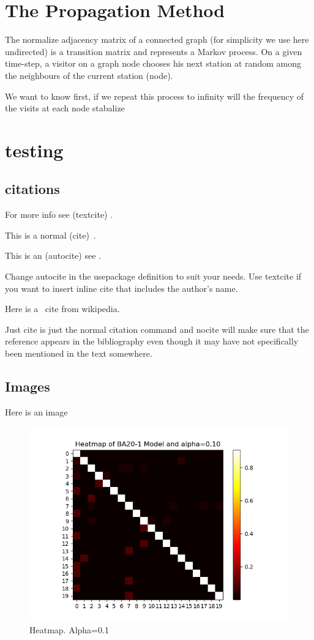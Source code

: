 \documentclass[a4paper,10pt]{article}
\theoremstyle{definition}
\theoremstyle{remark}
\theoremstyle{plain}
\begin{document}
\section{The Propagation Method}
The normalize adjacency matrix of 
a connected graph (for simplicity we use here undirected) is a transition matrix
and represents a
Markov process. On a given time-step, a visitor on a graph node chooses
his next station at random among the neighbours of the current station (node).

We want to know first, if we repeat this process to infinity will the frequency
of the visits at each node stabalize 

\section{testing}

\subsection{citations}

For more info see (textcite) \textcite[631]{meyer2000matrix}.

This is a normal (cite)~\cite[p.~115]{big}.

This is an (autocite) see \autocite[231]{lion2010}.

Change autocite in the usepackage definition to suit your needs. Use textcite if
you want to insert inline cite that includes the author's name.

Here is a~\cite{WikipediaPerronFrobenius} cite from wikipedia.

Just cite is just the normal citation command and nocite will make sure that the
reference appears in the bibliography even though it may have not specifically
been mentioned in the text somewhere.

\subsection{Images}

Here is an image


\begin{figure}[!htb]
  \centering
    \includegraphics[width=0.65\linewidth]{Heatmap BA20-1 alpha=0.10.png}
  \caption{Heatmap. Alpha=0.1}
  \label{fig:heatmap}
\end{figure}
\end{document}
